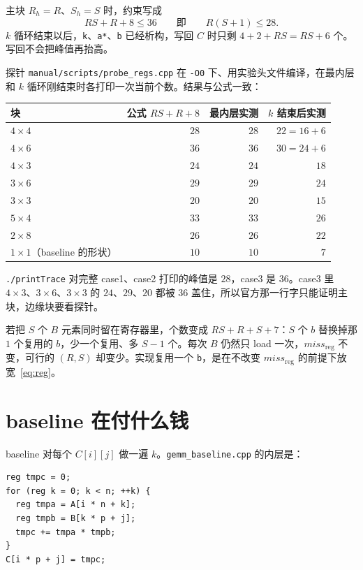 \documentclass[11pt,a4paper,fontset=fandol]{ctexart}
\newcommand{\code}[1]{\texttt{#1}}
\newcommand{\mreg}{\mathit{miss}_{\mathrm{reg}}}
\begin{document}
主块 $R_h=R$、$S_h=S$ 时，约束写成
\begin{equation}
\label{eq:reg}
RS+R+8\le 36\qquad\text{即}\qquad R(S+1)\le 28.
\end{equation}
$k$ 循环结束以后，\code{k}、\code{a*}、\code{b} 已经析构，写回 $C$ 时只剩 $4+2+RS=RS+6$ 个。写回不会把峰值再抬高。

探针 \code{manual/scripts/probe\_regs.cpp} 在 \code{-O0} 下、用实验头文件编译，在最内层和 $k$ 循环刚结束时各打印一次当前个数。结果与公式一致：

\begin{center}
\begin{tabular}{@{}lrrr@{}}
\toprule
块 & 公式 $RS+R+8$ & 最内层实测 & $k$ 结束后实测\\
\midrule
$4\times4$ & $28$ & $28$ & $22=16+6$\\
$4\times6$ & $36$ & $36$ & $30=24+6$\\
$4\times3$ & $24$ & $24$ & $18$\\
$3\times6$ & $29$ & $29$ & $24$\\
$3\times3$ & $20$ & $20$ & $15$\\
$5\times4$ & $33$ & $33$ & $26$\\
$2\times8$ & $26$ & $26$ & $22$\\
$1\times1$（baseline 的形状） & $10$ & $10$ & $7$\\
\bottomrule
\end{tabular}
\end{center}

\code{./printTrace} 对完整 case1、case2 打印的峰值是 $28$，case3 是 $36$。case3 里 $4\times3$、$3\times6$、$3\times3$ 的 $24$、$29$、$20$ 都被 $36$ 盖住，所以官方那一行字只能证明主块，边缘块要看探针。

若把 $S$ 个 $B$ 元素同时留在寄存器里，个数变成 $RS+R+S+7$：$S$ 个 $b$ 替换掉那 $1$ 个复用的 $b$，少一个复用、多 $S-1$ 个。每次 $B$ 仍然只 load 一次，$\mreg$ 不变，可行的 $(R,S)$ 却变少。实现复用一个 \code{b}，是在不改变 $\mreg$ 的前提下放宽~\eqref{eq:reg}。

\section{baseline 在付什么钱}
\label{sec:base}

baseline 对每个 $C[i][j]$ 做一遍 $k$。\code{gemm\_baseline.cpp} 的内层是：

\begin{lstlisting}
reg tmpc = 0;
for (reg k = 0; k < n; ++k) {
  reg tmpa = A[i * n + k];
  reg tmpb = B[k * p + j];
  tmpc += tmpa * tmpb;
}
C[i * p + j] = tmpc;
\end{lstlisting}
\end{document}

